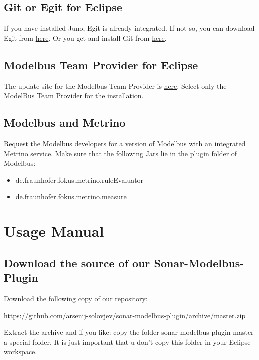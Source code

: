 \subsection{Git or Egit for Eclipse}
If you have installed Juno, Egit is already integrated. If not so, you can download Egit from \href{http://download.eclipse.org/egit/updates}{here}. Or you get and install Git from \href{http://git-scm.com/download/}{here}.
	


\subsection{Modelbus Team Provider for Eclipse}
The update site for the Modelbus Team Provider is \href{http://www.modelbus.org/modelbus/downloads/current/site}{here}. Select only the ModelBus Team Provider for the installation.



\subsection{Modelbus and Metrino}
Request \href{http://www.modelbus.org/modelbus/}{the Modelbus developers} for a version of Modelbus with an integrated Metrino service. Make sure that the following Jars lie in the plugin folder of Modelbus:
\begin{itemize}
	\item de.fraunhofer.fokus.metrino.ruleEvaluator
	\item de.fraunhofer.fokus.metrino.measure
\end{itemize}



\section{Usage Manual}



\subsection{Download the source of our Sonar-Modelbus-Plugin}
Download the following copy of our repository:

\url{https://github.com/arsenij-solovjev/sonar-modelbus-plugin/archive/master.zip}

Extract the archive and if you like: copy the folder sonar-modelbus-plugin-master a special folder. It is just important that u don't copy this folder in your Eclipse workspace.




